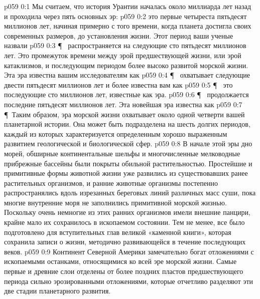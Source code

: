 \author{Носитель Жизни}
\vs p059 0:1 Мы считаем, что история Урантии началась около миллиарда лет назад и проходила через пять основных эр:
\vs p059 0:2 \bibnobreakspace {} это первые четыреста пятьдесят миллионов лет, начиная примерно с того времени, когда планета достигла своих современных размеров, до установления жизни. Этот период ваши ученые назвали 
\vs p059 0:3 \P\ \bibnobreakspace {} распространяется на следующие сто пятьдесят миллионов лет. Это промежуток времени между эрой предшествующей жизни, или эрой катаклизмов, и последующим периодом более высоко развитой морской жизни. Эта эра известна вашим исследователям как 
\vs p059 0:4 \P\ \bibnobreakspace {} охватывает следующие двести пятьдесят миллионов лет и более известна вам как 
\vs p059 0:5 \P\ \bibnobreakspace {} это последующие сто миллионов лет, известные как  эра.
\vs p059 0:6 \P\ \bibnobreakspace {} продолжается последние пятьдесят миллионов лет. Эта новейшая эра известна как 
\vs p059 0:7 \P\ Таким образом, эра морской жизни охватывает около одной четверти вашей планетарной истории. Она может быть подразделена на шесть долгих периодов, каждый из которых характеризуется определенным хорошо выраженным развитием геологической и биологической сфер.
\vs p059 0:8 В начале этой эры дно морей, обширные континентальные шельфы и многочисленные мелководные прибрежные бассейны были покрыты обильной растительностью. Простейшие и примитивные формы животной жизни уже развились из существовавших ранее растительных организмов, и ранние животные организмы постепенно распространялись вдоль изрезанных береговых линий различных масс суши, пока многие внутренние моря не заполнились примитивной морской жизнью. Поскольку очень немногие из этих ранних организмов имели внешние панцири, крайне мало их сохранилось в ископаемом состоянии. Тем не менее, все было подготовлено для вступительных глав великой «каменной книги», которая сохранила записи о жизни, методично развивающейся в течение последующих веков.
\vs p059 0:9 Континент Северной Америки замечательно богат отложениями с ископаемыми останками, относящимися ко всей эре морской жизни. Самые первые и древние слои отделены от более поздних пластов предшествующего периода сильно эрозированными отложениями, которые отчетливо разделяют эти две стадии планетарного развития.
